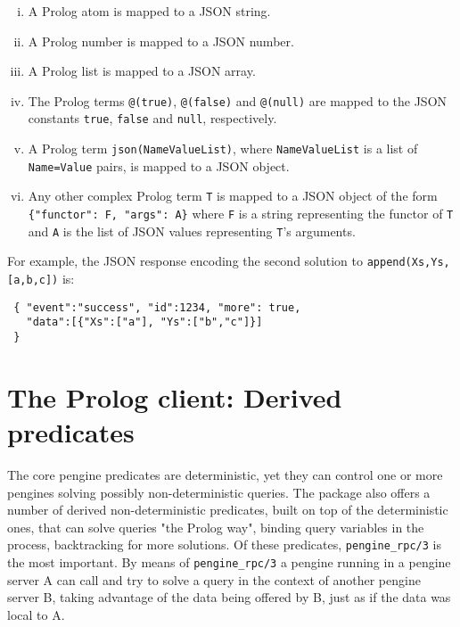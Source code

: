 \documentclass{new_tlp}
\begin{document}
\begin{enumerate}[(iii).]
    \renewcommand{\theenumi}{(\roman{enumi})}
    \item A Prolog atom is mapped to a JSON string.
    \item A Prolog number is mapped to a JSON number.
    \item A Prolog list is mapped to a JSON array.
    \item The Prolog terms \texttt{@(true)}, \texttt{@(false)} and \texttt{@(null)} are mapped to the
          JSON constants \texttt{true}, \texttt{false} and \texttt{null}, respectively.
    \item A Prolog term \texttt{json(NameValueList)}, where \texttt{NameValueList} is a
          list of \texttt{Name=Value} pairs, is mapped to a JSON object.
    \item Any other complex Prolog term \texttt{T} is mapped to a JSON object of
          the form \texttt{\{"functor": F, "args": A\}} where \texttt{F} is a string
          representing the functor of \texttt{T} and \texttt{A} is the list of JSON values
          representing \texttt{T}'s arguments.
\end{enumerate}

\noindent For example, the JSON response encoding the second solution to
\texttt{append(Xs,Ys,[a,b,c])} is:

\begin{verbatim}
 { "event":"success", "id":1234, "more": true,
   "data":[{"Xs":["a"], "Ys":["b","c"]}]
 }
\end{verbatim}


\section{The Prolog client: Derived predicates}
\label{sec:derived}

The core pengine predicates are   deterministic, yet they can control
one or more pengines solving possibly non-deterministic queries. The
package also offers a number of derived  non-deterministic predicates,
built on top of the deterministic ones, that can  solve queries "the
Prolog way", binding query variables in the process, backtracking for
more solutions. Of these predicates, \texttt{pengine\_rpc/3} is the
most important. By means of \texttt{pengine\_rpc/3} a pengine running in
a pengine server A can call and try to solve a query in the  context
of  another pengine server B, taking advantage of the data being offered
by B, just as if the data was local to A.
\end{document}
